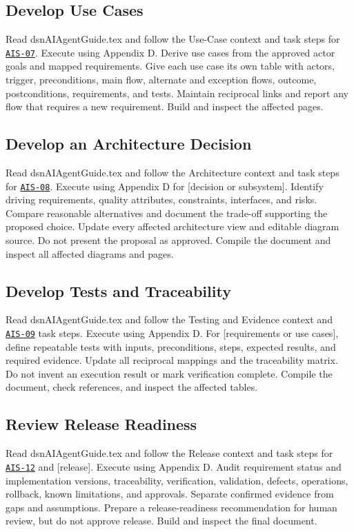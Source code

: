 \subsection{Develop Use Cases}
\begingroup\ttfamily\raggedright
\noindent Read dsnAIAgentGuide.tex and follow the Use-Case context and task steps for \hyperref[Skill:AIS-07]{\texttt{AIS-07}}. Execute using Appendix D. Derive use cases from the approved actor goals and mapped requirements. Give each use case its own table with actors, trigger, preconditions, main flow, alternate and exception flows, outcome, postconditions, requirements, and tests. Maintain reciprocal links and report any flow that requires a new requirement. Build and inspect the affected pages.\par
\endgroup


\subsection{Develop an Architecture Decision}
\begingroup\ttfamily\raggedright
\noindent Read dsnAIAgentGuide.tex and follow the Architecture context and task steps for \hyperref[Skill:AIS-08]{\texttt{AIS-08}}. Execute using Appendix D for [decision or subsystem]. Identify driving requirements, quality attributes, constraints, interfaces, and risks. Compare reasonable alternatives and document the trade-off supporting the proposed choice. Update every affected architecture view and editable diagram source. Do not present the proposal as approved. Compile the document and inspect all affected diagrams and pages.\par
\endgroup


\subsection{Develop Tests and Traceability}
\begingroup\ttfamily\raggedright
\noindent Read dsnAIAgentGuide.tex and follow the Testing and Evidence context and \hyperref[Skill:AIS-09]{\texttt{AIS-09}} task steps. Execute using Appendix D. For [requirements or use cases], define repeatable tests with inputs, preconditions, steps, expected results, and required evidence. Update all reciprocal mappings and the traceability matrix. Do not invent an execution result or mark verification complete. Compile the document, check references, and inspect the affected tables.\par
\endgroup


\subsection{Review Release Readiness}
\begingroup\ttfamily\raggedright
\noindent Read dsnAIAgentGuide.tex and follow the Release context and task steps for \hyperref[Skill:AIS-12]{\texttt{AIS-12}} and [release]. Execute using Appendix D. Audit requirement status and implementation versions, traceability, verification, validation, defects, operations, rollback, known limitations, and approvals. Separate confirmed evidence from gaps and assumptions. Prepare a release-readiness recommendation for human review, but do not approve release. Build and inspect the final document.\par
\endgroup


